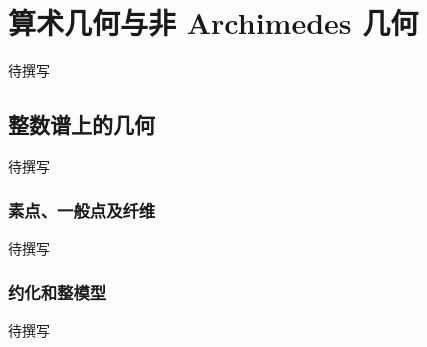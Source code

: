 
% 
% 
% 
% 
% 
% 
% 
% 
% 

\chapter{算术几何与非 Archimedes 几何}
\label{g5:app:A}

待撰写

\section{整数谱上的几何}
\label{g5:sec:A01}
待撰写

\subsection{素点、一般点及纤维}
\label{g5:subsec:A01:01}
待撰写

\subsection{约化和整模型}
\label{g5:subsec:A01:02}
待撰写

